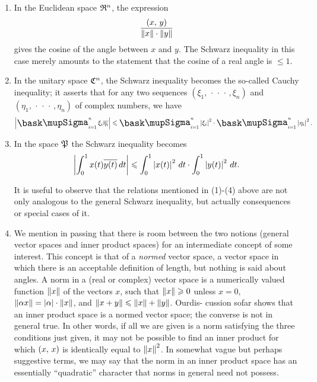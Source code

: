 \begin{enumerate}[wide, nosep, label=(\arabic*)]
    \item In the Euclidean space \(\mathfrak{R}^n\), the expression
    \begin{equation*}
        \frac{\left(x,\,y\right)}{\left\lVert x\right\rVert\cdot\left\lVert y\right\rVert}
    \end{equation*}
    gives the cosine of the angle between \(x\) and \(y\). The Schwarz
    inequality in this case merely amounts to the statement that the cosine of a
    real angle is \(\leq 1\).

    \item In the unitary space \(\mathfrak{C}^n\), the Schwarz inequality becomes
    the so-called Cauchy inequality; it asserts that for any two sequences
    \((\xi_1, \, \cdot\, \cdot\, \cdot\,, \xi_n)\) and \((\eta_1,
    \, \cdot\, \cdot\, \cdot\,, \eta_n)\) of complex numbers, we have
    \begin{equation*}
        \abs{\sumx_{i = 1}^n \xi_i\overline{\eta_i}} \leq \sumx_{i = 1}^n \abs{\xi_i}^2\cdot\sumx_{i = 1}^n \abs{\eta_i}^2.
    \end{equation*}

    \item In the space \(\mathfrak{P}\) the Schwarz inequality becomes
    \begin{equation*}
        \left\lvert\int_{0}^{1} x(t)\overline{y(t)}\, dt\right\rvert \leqslant \int_0^1 \left\lvert x(t)\right\rvert^2\, dt\cdot\int_0^1 \left\lvert y(t)\right\rvert^2\, dt.
    \end{equation*}

    It is useful to observe that the relations mentioned in (1)-(4) above are
    not only analogous to the general Schwarz inequality, but actually
    consequences or special cases of it.

    \item We mention in passing that there is room between the two notions
    (general vector spaces and inner product spaces) for an intermediate concept
    of some interest. This concept is that of a \emph{normed} vector space, a
    vector space in which there is an acceptable definition of length, but
    nothing is said about angles. A norm in a (real or complex) vector space is
    a numerically valued function \(\left\lVert x\right\rVert\) of the vectors \(x\), such that
    \(\left\lVert x\right\rVert \geqslant 0\) unless \(x = 0\), \(\left\lVert\alpha x\right\rVert =
    \left\lvert\alpha\right\rvert\cdot\left\lVert x\right\rVert\), and \(\left\lVert x + y\right\rVert \leqslant \left\lVert x\right\rVert + \left\lVert y\right\rVert\).
    Ourdis- cussion sofar shows that an inner product space is a normed vector
    space; the converse is not in general true. In other words, if all we are
    given is a norm satisfying the three conditions just given, it may not be
    possible to find an inner product for which \(\left(x,\,x\right)\) is
    identically equal to \(\left\lVert x\right\rVert^2\). In somewhat vague but perhaps
    suggestive terms, we may say that the norm in an inner product space has an
    essentially ``quadratic'' character that norms in general need not possess.
\end{enumerate}

